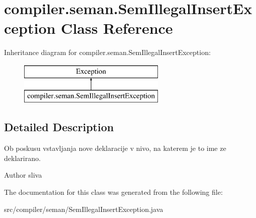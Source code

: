 \hypertarget{classcompiler_1_1seman_1_1_sem_illegal_insert_exception}{}\section{compiler.\+seman.\+Sem\+Illegal\+Insert\+Exception Class Reference}
\label{classcompiler_1_1seman_1_1_sem_illegal_insert_exception}
Inheritance diagram for compiler.\+seman.\+Sem\+Illegal\+Insert\+Exception\+:\begin{figure}[H]
\begin{center}
\leavevmode
\includegraphics[height=2.000000cm]{classcompiler_1_1seman_1_1_sem_illegal_insert_exception}
\end{center}
\end{figure}


\subsection{Detailed Description}
Ob poskusu vstavljanja nove deklaracije v nivo, na katerem je to ime ze deklarirano.

\begin{DoxyAuthor}{Author}
sliva 
\end{DoxyAuthor}


The documentation for this class was generated from the following file\+:\begin{DoxyCompactItemize}
\item 
src/compiler/seman/Sem\+Illegal\+Insert\+Exception.\+java\end{DoxyCompactItemize}
